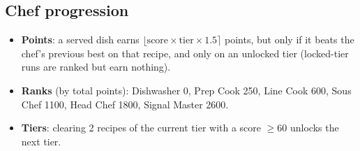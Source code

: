 \documentclass[11pt,a4paper]{article}
\begin{document}
\subsection{Chef progression}
\begin{itemize}
\item \textbf{Points}: a served dish earns $\lfloor\text{score}\times\text{tier}\times1.5\rceil$
  points, but only if it beats the chef's previous best on that recipe, and only on an
  unlocked tier (locked-tier runs are ranked but earn nothing).
\item \textbf{Ranks} (by total points): Dishwasher 0, Prep Cook 250, Line Cook 600,
  Sous Chef 1100, Head Chef 1800, Signal Master 2600.
\item \textbf{Tiers}: clearing 2 recipes of the current tier with a score $\geq 60$
  unlocks the next tier.
\end{itemize}

\end{document}
